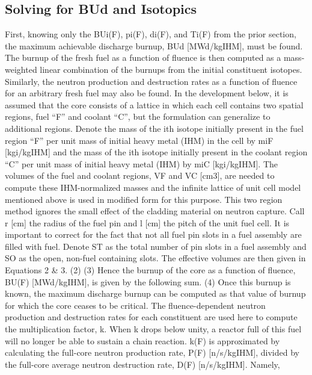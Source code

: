 \subsection{Solving for BUd and Isotopics}
\label{1g_sec:solve_BUd_iso}
First, knowing only the BUi(F), pi(F), di(F), and Ti(F) from the prior section, the maximum achievable discharge burnup, BUd [MWd/kgIHM], must be found.  The burnup of the fresh fuel as a function of fluence is then computed as a mass-weighted linear combination of the burnups from the initial constituent isotopes.  Similarly, the neutron production and destruction rates as a function of fluence for an arbitrary fresh fuel may also be found.  In the development below, it is assumed that the core consists of a lattice in which each cell contains two spatial regions, fuel “F” and coolant “C”, but the formulation can generalize to additional regions.  Denote the mass of the ith isotope initially present in the fuel region “F” per unit mass of initial heavy metal (IHM) in the cell by miF [kgi/kgIHM] and the mass of the ith isotope initially present in the coolant region “C” per unit mass of initial heavy metal (IHM) by miC [kgi/kgIHM].  
The volumes of the fuel and coolant regions, VF and VC [cm3], are needed to compute these IHM-normalized masses and the infinite lattice of unit cell model mentioned above is used in modified form for this purpose.  This two region method ignores the small effect of the cladding material on neutron capture.  Call r [cm] the radius of the fuel pin and l [cm] the pitch of the unit fuel cell.  It is important to correct for the fact that not all fuel pin slots in a fuel assembly are filled with fuel.  Denote ST as the total number of pin slots in a fuel assembly and SO as the open, non-fuel containing slots.  The effective volumes are then given in Equations 2 & 3.
                                         (2)
                         (3)
Hence the burnup of the core as a function of fluence, BU(F) [MWd/kgIHM], is given by the following sum.
                                (4)
Once this burnup is known, the maximum discharge burnup can be computed as that value of burnup for which the core ceases to be critical.  The fluence-dependent neutron production and destruction rates for each constituent are used here to compute the multiplication factor, k.    When k drops below unity, a reactor full of this fuel will no longer be able to sustain a chain reaction.  k(F) is approximated by calculating the full-core neutron production rate, P(F) [n/s/kgIHM], divided by the full-core average neutron destruction rate, D(F) [n/s/kgIHM].  Namely,
